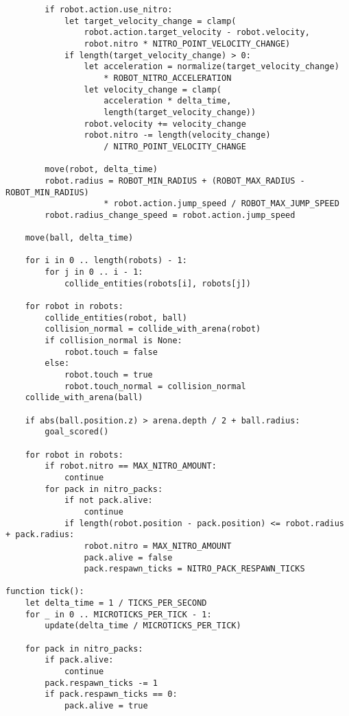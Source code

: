 \begin{verbatim}
        if robot.action.use_nitro:
            let target_velocity_change = clamp(
                robot.action.target_velocity - robot.velocity,
                robot.nitro * NITRO_POINT_VELOCITY_CHANGE)
            if length(target_velocity_change) > 0:
                let acceleration = normalize(target_velocity_change)
                    * ROBOT_NITRO_ACCELERATION
                let velocity_change = clamp(
                    acceleration * delta_time,
                    length(target_velocity_change))
                robot.velocity += velocity_change
                robot.nitro -= length(velocity_change)
                    / NITRO_POINT_VELOCITY_CHANGE

        move(robot, delta_time)
        robot.radius = ROBOT_MIN_RADIUS + (ROBOT_MAX_RADIUS - ROBOT_MIN_RADIUS)
                    * robot.action.jump_speed / ROBOT_MAX_JUMP_SPEED
        robot.radius_change_speed = robot.action.jump_speed

    move(ball, delta_time)

    for i in 0 .. length(robots) - 1:
        for j in 0 .. i - 1:
            collide_entities(robots[i], robots[j])

    for robot in robots:
        collide_entities(robot, ball)
        collision_normal = collide_with_arena(robot)
        if collision_normal is None:
            robot.touch = false
        else:
            robot.touch = true
            robot.touch_normal = collision_normal
    collide_with_arena(ball)

    if abs(ball.position.z) > arena.depth / 2 + ball.radius:
        goal_scored()

    for robot in robots:
        if robot.nitro == MAX_NITRO_AMOUNT:
            continue
        for pack in nitro_packs:
            if not pack.alive:
                continue
            if length(robot.position - pack.position) <= robot.radius + pack.radius:
                robot.nitro = MAX_NITRO_AMOUNT
                pack.alive = false
                pack.respawn_ticks = NITRO_PACK_RESPAWN_TICKS

function tick():
    let delta_time = 1 / TICKS_PER_SECOND
    for _ in 0 .. MICROTICKS_PER_TICK - 1:
        update(delta_time / MICROTICKS_PER_TICK)

    for pack in nitro_packs:
        if pack.alive:
            continue
        pack.respawn_ticks -= 1
        if pack.respawn_ticks == 0:
            pack.alive = true
\end{verbatim}

